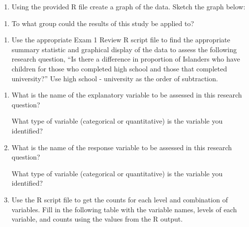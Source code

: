 \documentclass[
]{report}
\providecommand{\tightlist}{%
  \setlength{\itemsep}{0pt}\setlength{\parskip}{0pt}}
\begin{document}
\begin{enumerate}
\def\labelenumi{\alph{enumi}.}
\setcounter{enumi}{6}
\tightlist
\item
  Using the provided R file create a graph of the data. Sketch the graph below:
\end{enumerate}

\vspace{1.8in}

\begin{enumerate}
\def\labelenumi{\alph{enumi}.}
\setcounter{enumi}{7}
\tightlist
\item
  To what group could the results of this study be applied to?
\end{enumerate}

\vspace{0.2in}

\begin{enumerate}
\def\labelenumi{\arabic{enumi}.}
\setcounter{enumi}{4}
\tightlist
\item
  Use the appropriate Exam 1 Review R script file to find the appropriate summary statistic and graphical display of the data to assess the following research question, ``Is there a difference in proportion of Islanders who have children for those who completed high school and those that completed university?'' Use high school - university as the order of subtraction.
\end{enumerate}

\begin{enumerate}
\def\labelenumi{\alph{enumi}.}
\item
  What is the name of the explanatory variable to be assessed in this research question?
  \vspace{0.3in}

  What type of variable (categorical or quantitative) is the variable you identified?
  \vspace{0.3in}
\item
  What is the name of the response variable to be assessed in this research question?
  \vspace{0.3in}

  What type of variable (categorical or quantitative) is the variable you identified?
  \vspace{0.3in}
\item
  Use the R script file to get the counts for each level and combination of variables. Fill in the following table with the variable names, levels of each variable, and counts using the values from the R output.
\end{enumerate}
\end{document}
